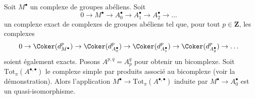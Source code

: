 \begin{lemma}
\label{lemma-good-right-resolution-gives-qis}
Soit $M^\bullet$ un complexe de groupes abéliens. Soit
$$
0 \to M^\bullet \to A_0^\bullet \to A_1^\bullet \to A_2^\bullet \to \ldots
$$
un complexe exact de complexes de groupes abéliens
tel que, pour tout $p \in \mathbf{Z}$, les complexes
$$
0 \to
\Coker(d_{M^\bullet}^p) \to
\Coker(d_{A_0^\bullet}^p) \to
\Coker(d_{A_1^\bullet}^p) \to
\Coker(d_{A_2^\bullet}^p) \to \ldots
$$
soient également exacts. Posons $A^{p, q} = A_p^q$ pour obtenir un
bicomplexe. Soit $\text{Tot}_\pi(A^{\bullet, \bullet})$ le
complexe simple par produits associé au bicomplexe
(voir la démonstration). Alors l'application
$M^\bullet \to \text{Tot}_\pi(A^{\bullet, \bullet})$
induite par $M^\bullet \to A_0^\bullet$ est un quasi-isomorphisme.
\end{lemma}

